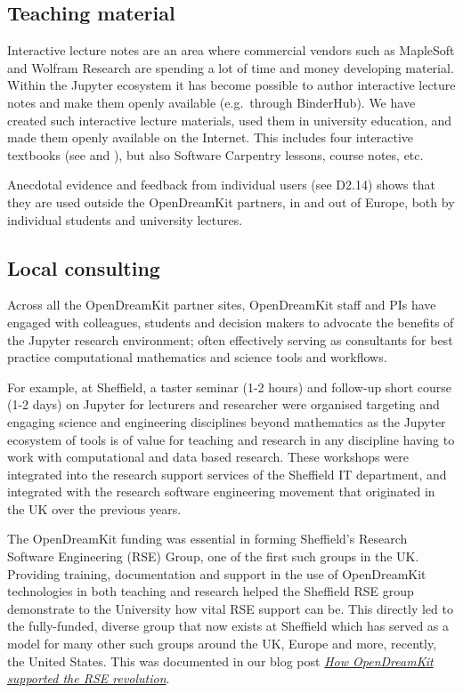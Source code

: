 \documentclass{deliverablereport}
\begin{document}
\subsection{Teaching material}

Interactive lecture notes are an area where commercial vendors such as
MapleSoft and Wolfram Research are spending a lot of time and money
developing material. Within the Jupyter ecosystem it has become possible
to author interactive lecture notes and make them openly available
(e.g.~through BinderHub). We have created such interactive lecture
materials, used them in university education, and made them openly
available on the Internet. This includes four interactive textbooks (see
 and ), but also Software Carpentry lessons, course notes,
etc.

Anecdotal evidence and feedback from individual users (see D2.14) shows
that they are used outside the OpenDreamKit partners, in and out of
Europe, both by individual students and university lectures.

\subsection{Local consulting}

Across all the OpenDreamKit partner sites, OpenDreamKit staff and PIs
have engaged with colleagues, students and decision makers to advocate
the benefits of the Jupyter research environment; often effectively
serving as consultants for best practice computational mathematics and
science tools and workflows.

For example,
at Sheffield, a taster seminar (1-2 hours) and follow-up short course (1-2
days) on Jupyter for lecturers and researcher were organised targeting
and engaging science and engineering disciplines beyond mathematics as
the Jupyter ecosystem of tools is of value for teaching and research in
any discipline having to work with computational and data based
research. These workshops were integrated into the research support
services of the Sheffield IT department, and integrated with the
research software engineering movement that originated in the UK over
the previous years.

The OpenDreamKit funding was essential in forming Sheffield's Research
Software Engineering (RSE) Group, one of the first such groups in the
UK. Providing training, documentation and support in the use of
OpenDreamKit technologies in both teaching and research helped the
Sheffield RSE group demonstrate to the University how vital RSE support
can be. This directly led to the fully-funded, diverse group that now
exists at Sheffield which has served as a model for many other such
groups around the UK, Europe and more, recently, the United States.
This was documented in our blog post
\href{https://opendreamkit.org/2018/10/29/ODK-RSE/}{\emph{How OpenDreamKit
  supported the RSE revolution}}.
\end{document}
